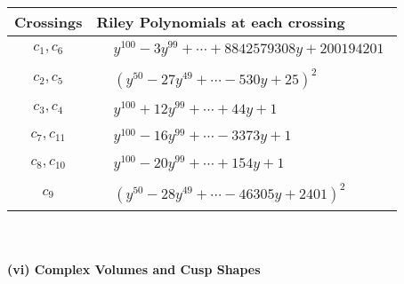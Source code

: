 \documentclass[1p]{elsarticle_modified}
\theoremstyle{definition}
\begin{document}
\begin{tabular}{m{50pt}|m{274pt}}
Crossings & \hspace{64pt}Riley Polynomials at each crossing \\
\hline $$\begin{aligned}c_{1},c_{6}\end{aligned}$$&$\begin{aligned}
&y^{100}-3 y^{99}+\cdots+8842579308 y+200194201
\end{aligned}$\\
\hline $$\begin{aligned}c_{2},c_{5}\end{aligned}$$&$\begin{aligned}
&(y^{50}-27 y^{49}+\cdots-530 y+25)^{2}
\end{aligned}$\\
\hline $$\begin{aligned}c_{3},c_{4}\end{aligned}$$&$\begin{aligned}
&y^{100}+12 y^{99}+\cdots+44 y+1
\end{aligned}$\\
\hline $$\begin{aligned}c_{7},c_{11}\end{aligned}$$&$\begin{aligned}
&y^{100}-16 y^{99}+\cdots-3373 y+1
\end{aligned}$\\
\hline $$\begin{aligned}c_{8},c_{10}\end{aligned}$$&$\begin{aligned}
&y^{100}-20 y^{99}+\cdots+154 y+1
\end{aligned}$\\
\hline $$\begin{aligned}c_{9}\end{aligned}$$&$\begin{aligned}
&(y^{50}-28 y^{49}+\cdots-46305 y+2401)^{2}
\end{aligned}$\\
\hline
\end{tabular}\\~\\
\newpage\flushleft \textbf{(vi) Complex Volumes and Cusp Shapes}
\end{document}
